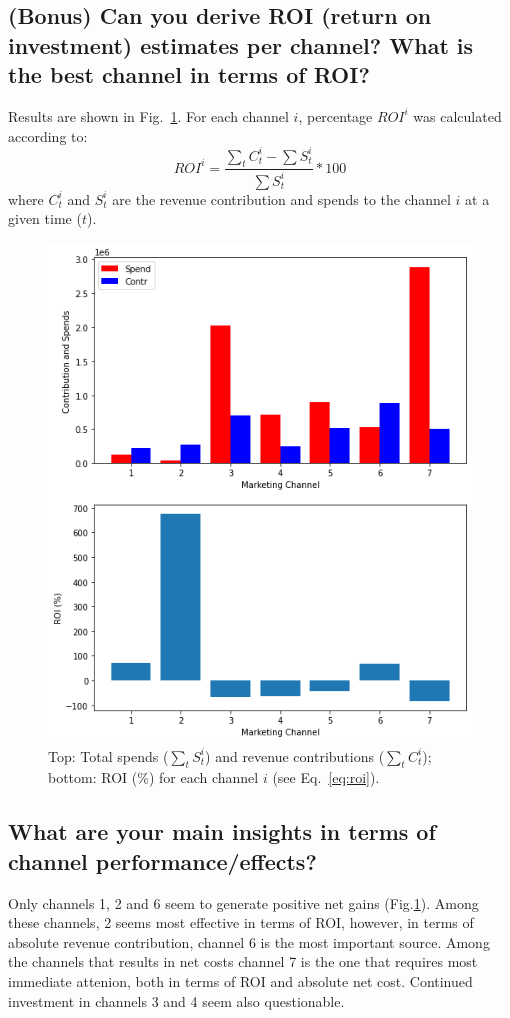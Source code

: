 \documentclass[a4paper,10pt]{scrartcl}
\begin{document}
\FloatBarrier

\subsection {(Bonus) Can you derive ROI (return on investment) estimates per channel? What is the best channel in terms of ROI?}
Results are shown in Fig.~\ref{f:CS_ROI}. For each channel $i$, percentage $ROI^i$ was calculated according to:
\begin{equation}\label{eq:roi}
 ROI^i = \frac{\sum_t C_t^i - \sum S_t^i}{\sum S_t^i} * 100
\end{equation}
where $C_t^i$ and $S_t^i$ are the revenue contribution and spends to the channel $i$ at a given time ($t$).  


\begin{figure}[!h]
  \centering
  \includegraphics[trim=0mm 0mm 0mm 0mm, clip, width=.5\textwidth]{contributions_roi.png}
  \caption{Top: Total spends ($\sum_t S_t^i$) and revenue contributions ($\sum_t C_t^i$); bottom: ROI (\%) for each channel $i$ (see Eq.~\ref{eq:roi}).}\label{f:CS_ROI}
\end{figure}

\FloatBarrier

\subsection {What are your main insights in terms of channel performance/effects?}


Only channels 1, 2 and 6 seem to generate positive net gains (Fig.\ref{f:CS_ROI}). Among these channels, 2 seems most effective in terms of ROI, however, in terms of absolute revenue contribution, channel 6 is the most important source. Among the channels that results in net costs channel 7 is the one that requires most immediate attenion, both in terms of ROI and absolute net cost. Continued investment in channels 3 and 4 seem also questionable.
\end{document}

